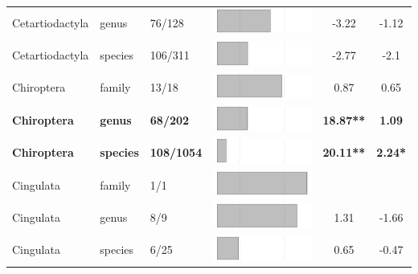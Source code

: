 \begin{longtable}{lL{1.8cm}C{2cm}lcc}
  Cetartiodactyla & genus & 76/128 & \includegraphics[width=0.20\linewidth, height=0.05\linewidth]{Table_figures/bar8.pdf} & -3.22 & -1.12 \\ 
  Cetartiodactyla & species & 106/311 & \includegraphics[width=0.20\linewidth, height=0.05\linewidth]{Table_figures/bar9.pdf} & -2.77 & -2.1 \\ 
  Chiroptera & family & 13/18 & \includegraphics[width=0.20\linewidth, height=0.05\linewidth]{Table_figures/bar10.pdf} & 0.87 & 0.65 \\ 
  \textbf{Chiroptera} & \textbf{genus} & \textbf{68/202} & \includegraphics[width=0.20\linewidth, height=0.05\linewidth]{Table_figures/bar11.pdf} & \textbf{18.87**} & \textbf{1.09} \\ 
  \textbf{Chiroptera} & \textbf{species} & \textbf{108/1054} & \includegraphics[width=0.20\linewidth, height=0.05\linewidth]{Table_figures/bar12.pdf} & \textbf{20.11**} & \textbf{2.24*} \\ 
  Cingulata & family & 1/1 & \includegraphics[width=0.20\linewidth, height=0.05\linewidth]{Table_figures/bar13.pdf} &   &   \\ 
  Cingulata & genus & 8/9 & \includegraphics[width=0.20\linewidth, height=0.05\linewidth]{Table_figures/bar14.pdf} & 1.31 & -1.66 \\ 
  Cingulata & species & 6/25 & \includegraphics[width=0.20\linewidth, height=0.05\linewidth]{Table_figures/bar15.pdf} & 0.65 & -0.47 \\ 

\end{longtable}
